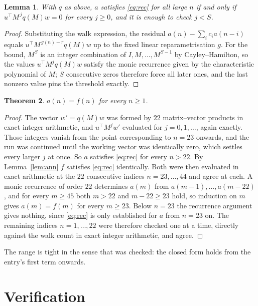 \documentclass[11pt,a4paper]{article}
\theoremstyle{plain}
\newtheorem{theorem}{Theorem}
\newtheorem{lemma}[theorem]{Lemma}
\theoremstyle{definition}
\begin{document}
\begin{lemma}\label{lem:crit}
With $q$ as above, $a$ satisfies \eqref{eq:rec} for all large $n$ if and only if
$u^{\!\top}M^{\,j}q(M)w=0$ for every $j\ge0$, and it is enough to check $j<S$.
\end{lemma}

\begin{proof}
Substituting the walk expression, the residual $a(n)-\sum_ic_ia(n-i)$ equals
$u^{\!\top}M^{\,g(n)-r}q(M)w$ up to the fixed linear reparametrisation $g$. For the bound,
$M^{S}$ is an integer combination of $I,M,\dots,M^{S-1}$ by Cayley--Hamilton, so the values
$u^{\!\top}M^{j}q(M)w$ satisfy the monic recurrence given by the characteristic polynomial of
$M$; $S$ consecutive zeros therefore force all later ones, and the last nonzero value pins the
threshold exactly.
\end{proof}

\begin{theorem}
$a(n)=f(n)$ for every $n\ge1$.
\end{theorem}

\begin{proof}
The vector $w'=q(M)w$ was formed by $22$ matrix--vector products in exact integer
arithmetic, and $u^{\!\top}M^{j}w'$ evaluated for $j=0,1,\dots$, again exactly. Those integers
vanish from the point corresponding to $n=23$ onwards, and the run was continued until the
working vector was identically zero, which settles every larger $j$ at once. So $a$ satisfies
\eqref{eq:rec} for every $n>22$. By Lemma~\ref{lem:ann} $f$ satisfies \eqref{eq:rec}
identically. Both were then evaluated in exact arithmetic at the $22$ consecutive indices
$n=23,\dots,44$ and agree at each. A monic recurrence of order $22$
determines $a(m)$ from $a(m-1),\dots,a(m-22)$, and for every $m\ge45$ both
$m>22$ and $m-22\ge23$ hold, so induction on $m$ gives $a(m)=f(m)$ for every
$m\ge23$.
Below $n=23$ the recurrence argument gives nothing, since \eqref{eq:rec} is only
established for $a$ from $n=23$ on. The remaining indices $n=1,\dots,22$ were
therefore checked one at a time, directly against the walk count in exact integer arithmetic,
and agree.
\end{proof}

The range is tight in the sense that was checked: the closed form holds from the entry's first term onwards.

\section{Verification}
\end{document}

